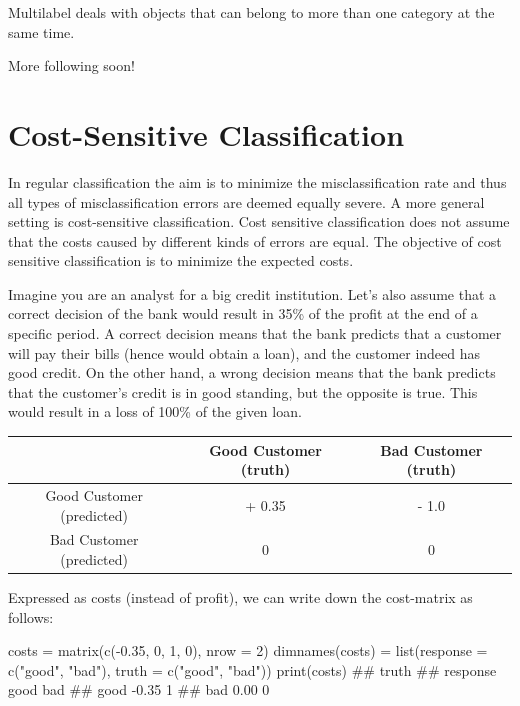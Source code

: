 \documentclass[
  11pt,
  parskip=half,
  DIV=calc,
  BCOR=10mm,
  x11names]{scrbook}
\newenvironment{Shaded}{}{}
\newcommand{\DataTypeTok}[1]{#1}
\newcommand{\DecValTok}[1]{#1}
\newcommand{\FloatTok}[1]{#1}
\newcommand{\KeywordTok}[1]{\textcolor[rgb]{0.00,0.00,1.00}{#1}}
\newcommand{\NormalTok}[1]{#1}
\newcommand{\OperatorTok}[1]{#1}
\newcommand{\StringTok}[1]{\textcolor[rgb]{0.00,0.50,0.50}{#1}}
\begin{document}
Multilabel deals with objects that can belong to more than one category at the same time.

More following soon!

\hypertarget{cost-sens}{%
\section{Cost-Sensitive Classification}\label{cost-sens}}

In regular classification the aim is to minimize the misclassification rate and thus all types of misclassification errors are deemed equally severe.
A more general setting is cost-sensitive classification.
Cost sensitive classification does not assume that the costs caused by different kinds of errors are equal.
The objective of cost sensitive classification is to minimize the expected costs.

Imagine you are an analyst for a big credit institution.
Let's also assume that a correct decision of the bank would result in 35\% of the profit at the end of a specific period.
A correct decision means that the bank predicts that a customer will pay their bills (hence would obtain a loan), and the customer indeed has good credit.
On the other hand, a wrong decision means that the bank predicts that the customer's credit is in good standing, but the opposite is true.
This would result in a loss of 100\% of the given loan.

\begin{longtable}[]{@{}ccc@{}}
\toprule
& Good Customer (truth) & Bad Customer (truth)\tabularnewline
\midrule
\endhead
Good Customer (predicted) & + 0.35 & - 1.0\tabularnewline
Bad Customer (predicted) & 0 & 0\tabularnewline
\bottomrule
\end{longtable}

Expressed as costs (instead of profit), we can write down the cost-matrix as follows:

\begin{Shaded}
\begin{Highlighting}[]
\NormalTok{costs =}\StringTok{ }\KeywordTok{matrix}\NormalTok{(}\KeywordTok{c}\NormalTok{(}\OperatorTok{-}\FloatTok{0.35}\NormalTok{, }\DecValTok{0}\NormalTok{, }\DecValTok{1}\NormalTok{, }\DecValTok{0}\NormalTok{), }\DataTypeTok{nrow =} \DecValTok{2}\NormalTok{)}
\KeywordTok{dimnames}\NormalTok{(costs) =}\StringTok{ }\KeywordTok{list}\NormalTok{(}\DataTypeTok{response =} \KeywordTok{c}\NormalTok{(}\StringTok{"good"}\NormalTok{, }\StringTok{"bad"}\NormalTok{), }\DataTypeTok{truth =} \KeywordTok{c}\NormalTok{(}\StringTok{"good"}\NormalTok{, }
  \StringTok{"bad"}\NormalTok{))}
\KeywordTok{print}\NormalTok{(costs)}
\NormalTok{##         truth}
\NormalTok{## response  good bad}
\NormalTok{##     good -0.35   1}
\NormalTok{##     bad   0.00   0}
\end{Highlighting}
\end{Shaded}
\end{document}
